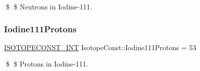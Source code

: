 \$ \$ Neutrons in Iodine-\/111. \mbox{\label{group___isotope_const-_iodine-_i111_ga59831d0cf94b10ea1b5d089314b27fe5}} 
\subsubsection{\texorpdfstring{Iodine111\+Protons}{Iodine111Protons}}
{\footnotesize\ttfamily \mbox{\hyperlink{group___isotope_const-_macros_ga5f18360b3e99483a35c32d789e62621c}{I\+S\+O\+T\+O\+P\+E\+C\+O\+N\+S\+T\+\_\+\+I\+NT}} Isotope\+Const\+::\+Iodine111\+Protons = 53}

\$ \$ Protons in Iodine-\/111. 